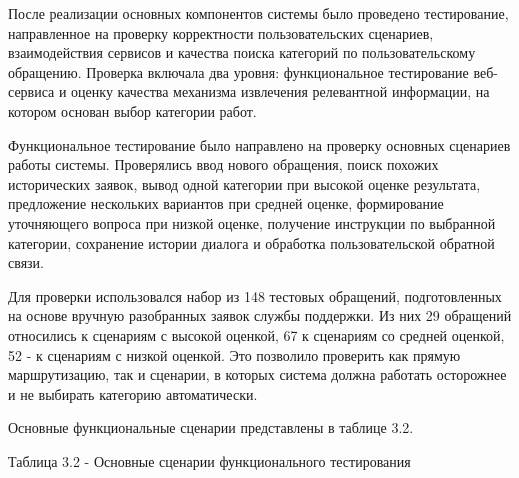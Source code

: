 \documentclass[14pt,a4paper]{extarticle}
\renewcommand{\textbf}[1]{#1}
\numberwithin{figure}{section}
\numberwithin{table}{section}
\begin{document}
После реализации основных компонентов системы было проведено
тестирование, направленное на проверку корректности пользовательских
сценариев, взаимодействия сервисов и качества поиска категорий по
пользовательскому обращению. Проверка включала два уровня:
функциональное тестирование веб-сервиса и оценку качества
механизма извлечения релевантной информации, на котором основан выбор категории работ.

Функциональное тестирование было направлено на проверку основных
сценариев работы системы. Проверялись ввод нового обращения, поиск
похожих исторических заявок, вывод одной категории при высокой
оценке результата, предложение нескольких вариантов при средней оценке,
формирование уточняющего вопроса при низкой оценке, получение
инструкции по выбранной категории, сохранение истории диалога и
обработка пользовательской обратной связи.

Для проверки использовался набор из 148 тестовых обращений,
подготовленных на основе вручную разобранных заявок службы поддержки. Из
них 29 обращений относились к сценариям с высокой оценкой, 67 к
сценариям со средней оценкой, 52 - к сценариям с низкой оценкой. Это
позволило проверить как прямую маршрутизацию, так и сценарии, в которых
система должна работать осторожнее и не выбирать категорию
автоматически.

Основные функциональные сценарии представлены в таблице 3.2.

\textbf{Таблица 3.2 - Основные сценарии функционального тестирования}
\end{document}
